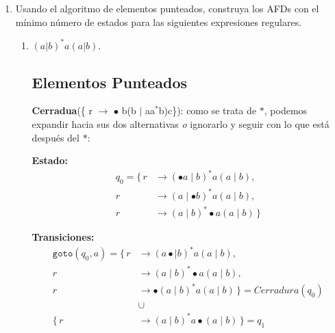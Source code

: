 \documentclass[12pt,letterpaper]{article}
\begin{document}
\begin{enumerate}[label=\arabic*.]
  \bigskip
  
  \begin{center}
  \end{center}
  
  
\newpage

\item Usando el algoritmo de elementos punteados, construya los AFDs con el mínimo número de estados para las siguientes expresiones regulares.
  
  \begin{enumerate}
    
  \item $(a|b)^*a(a|b)$.

    \subsection*{Elementos Punteados}
    \textbf{Cerradua}\big(\{ r $\to$ $\bullet$ b(b $\mid$ aa$^*$b)c\}\big): como se trata de $*$,
    podemos expandir hacia sus dos alternativas \emph{o} ignorarlo y seguir con lo que está después del $*$:
      
    \medskip

    \textbf{Estado:}
    \[
    \begin{aligned}
      q_0 = \{\,
      r &\to (\bullet a\mid b)^*a(a\mid b),\\
      r &\to (a\mid \bullet b)^*a(a\mid b),\\
      r &\to (a\mid b)^*\bullet a(a\mid b)
      \,\}
    \end{aligned}
    \]
    
    \textbf{Transiciones:}
    \[
    \begin{aligned}
      \texttt{goto}(q_0, a) =
        \{\,
        r &\to(a\bullet\mid b)^*a(a\mid b),\\
        r &\to(a\mid b)^*\bullet a(a\mid b),\\
        r &\to\bullet(a\mid b)^* a(a\mid b)
        \,\} = Cerradura(q_0) \\
      &\cup\\
        \{\,
        r &\to(a\mid b)^*a\bullet(a\mid b)
        \,\} = \boxed{q_1}
    \end{aligned}
    \]


\end{enumerate}
\end{enumerate}
\end{document}
